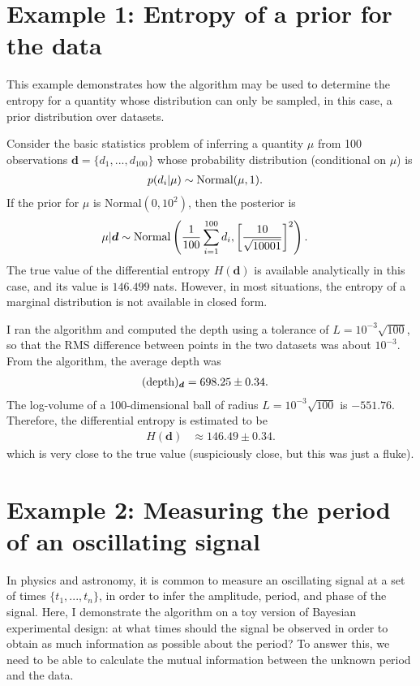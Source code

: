 \documentclass[entropy,article,accept,oneauthor,pdftex,10pt,a4paper]{mdpi}
\renewcommand{\d}{\boldsymbol{d}}
\newcommand{\depth}{(\textnormal{depth})}
\begin{document}
\section{Example 1: Entropy of a prior for the data}

This example demonstrates how the algorithm may be used to determine the
entropy for a quantity whose distribution can only be sampled, in this case,
a prior distribution over datasets.

Consider the basic statistics problem of inferring a quantity $\mu$ from
100 observations $\d = \{d_1, ..., d_{100}\}$ whose
probability distribution (conditional on $\mu$) is
\begin{align}
p(d_i | \mu) &\sim \textnormal{Normal}(\mu, 1).
\end{align}
If the prior for $\mu$ is Normal$(0, 10^2)$, then the posterior is
\begin{align}
\mu | \d &\sim \textnormal{Normal}\left(
                                       \frac{1}{100}\sum_{i=1}^{100} d_i,
                                       \left[\frac{10}{\sqrt{10001}}\right]^2
                                       \right).
\end{align}
The true value of the differential entropy $H(\d)$ is available analytically
in this case, and its value is $146.499$ nats. However, in most situations, the
entropy of a marginal distribution is not available in closed form. 

I ran the algorithm and computed the depth using a tolerance of
$L=10^{-3}\sqrt{100}$, so that the RMS difference between
points in the two datasets was about $10^{-3}$.
From the algorithm, the average depth was
\begin{align}
\depth_{\d} &= 698.25 \pm 0.34.
\end{align}
The log-volume of a 100-dimensional ball of radius
$L=10^{-3}\sqrt{100}$ is
$-551.76$. Therefore, the differential entropy is estimated to be
\begin{align}
H(\d) &\approx 146.49 \pm 0.34.
\end{align}
which is very close to the true value (suspiciously close, but this
was just a fluke).

\section{Example 2: Measuring the period of an oscillating signal}

In physics and astronomy, it is common to measure an oscillating signal
at a set of times $\{t_1, ..., t_n\}$, in order to infer the amplitude,
period, and phase of the signal.
Here, I demonstrate the algorithm on a toy version
of Bayesian experimental design: at what times should the signal be
observed in order to obtain as much information as possible about the
period? To answer this, we need to be able to calculate the mutual
information between the unknown period and the data.
\end{document}
